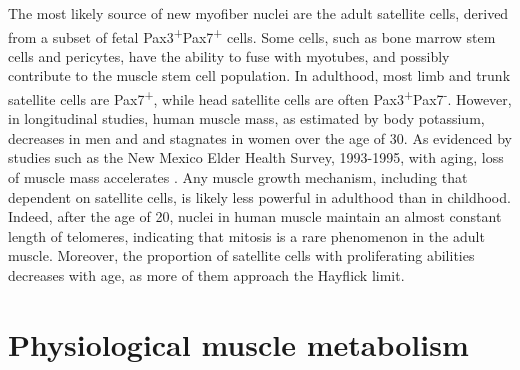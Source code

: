 \documentclass[12pt,english]{report}\usepackage[]{graphicx}\usepackage[]{color}
\begin{document}
The most likely source of new myofiber nuclei are the adult satellite
cells, derived from a subset of fetal Pax3\textsuperscript{+}Pax7\textsuperscript{+}
cells. Some cells, such as bone marrow stem cells and pericytes,
have the ability to fuse with myotubes, and possibly contribute to
the muscle stem cell population\citep{dellavalle2011pericytes,labarge2002biological}.
In adulthood, most limb and trunk satellite cells are Pax7\textsuperscript{+},
while head satellite cells are often Pax3\textsuperscript{+}Pax7\textsuperscript{-}\citep{relaix2006pax3}.
However, in longitudinal studies, human muscle mass, as estimated
by body potassium, decreases in men and and stagnates in women over
the age of 30\citep{forbes1970adult}. As evidenced by studies such
as the New Mexico Elder Health Survey, 1993-1995, with aging, loss
of muscle mass accelerates \citep{baumgartner1998epidemiology}. Any
muscle growth mechanism, including that dependent on satellite cells,
is likely less powerful in adulthood than in childhood. Indeed, after
the age of 20, nuclei in human muscle maintain an almost constant
length of telomeres, indicating that mitosis is a rare phenomenon
in the adult muscle\citep{decary1997replicative}. Moreover, the proportion
of satellite cells with proliferating abilities decreases with age,
as more of them approach the Hayflick limit\citep{renault2000skeletal}.


\section{Physiological muscle metabolism}
\end{document}
